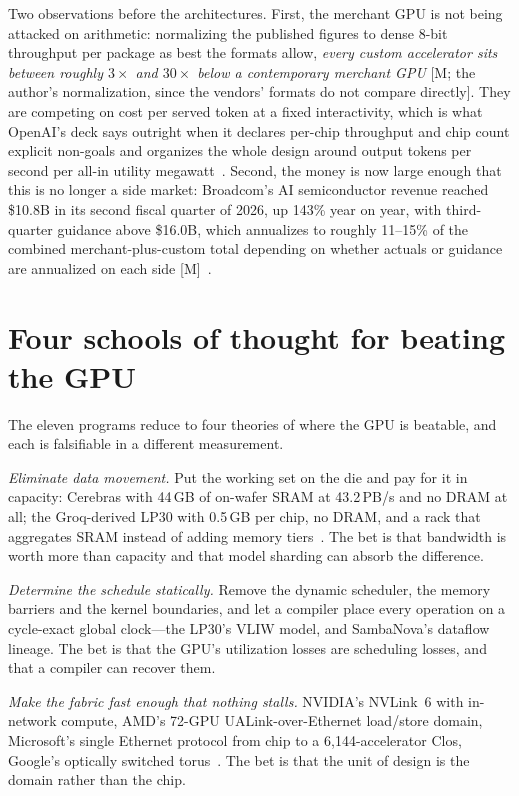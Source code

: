 Two observations before the architectures. First, the merchant GPU is not being attacked on arithmetic: normalizing the published figures to dense 8-bit throughput per package as best the formats allow, \emph{every custom accelerator sits between roughly $3\times$ and $30\times$ below a contemporary merchant GPU} [M; the author's normalization, since the vendors' formats do not compare directly]. They are competing on cost per served token at a fixed interactivity, which is what OpenAI's deck says outright when it declares per-chip throughput and chip count explicit non-goals and organizes the whole design around output tokens per second per all-in utility megawatt~\cite{hc2026-jalapeno}. Second, the money is now large enough that this is no longer a side market: Broadcom's AI semiconductor revenue reached \$10.8B in its second fiscal quarter of 2026, up 143\% year on year, with third-quarter guidance above \$16.0B, which annualizes to roughly 11--15\% of the combined merchant-plus-custom total depending on whether actuals or guidance are annualized on each side [M]~\cite{broadcom-q2fy26}.

\section{Four schools of thought for beating the GPU}

The eleven programs reduce to four theories of where the GPU is beatable, and each is falsifiable in a different measurement.

\emph{Eliminate data movement.} Put the working set on the die and pay for it in capacity: Cerebras with 44\,GB of on-wafer SRAM at 43.2\,PB/s and no DRAM at all; the Groq-derived LP30 with 0.5\,GB per chip, no DRAM, and a rack that aggregates SRAM instead of adding memory tiers~\cite{hc2026-lpu}. The bet is that bandwidth is worth more than capacity and that model sharding can absorb the difference.

\emph{Determine the schedule statically.} Remove the dynamic scheduler, the memory barriers and the kernel boundaries, and let a compiler place every operation on a cycle-exact global clock---the LP30's VLIW model, and SambaNova's dataflow lineage. The bet is that the GPU's utilization losses are scheduling losses, and that a compiler can recover them.

\emph{Make the fabric fast enough that nothing stalls.} NVIDIA's NVLink~6 with in-network compute, AMD's 72-GPU UALink-over-Ethernet load/store domain, Microsoft's single Ethernet protocol from chip to a 6{,}144-accelerator Clos, Google's optically switched torus~\cite{hc2026-scaleup}. The bet is that the unit of design is the domain rather than the chip.


